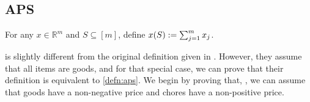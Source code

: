 \subsection{APS}
\label{sec:notions:aps}

For any $x \in \mathbb{R}^m$ and $S \subseteq [m]$, define $x(S) := \sum_{j=1}^m x_j$.


 is slightly different from the original definition given in \citet{babaioff2023fair}.
However, they assume that all items are goods, and for that special case,
we can prove that their definition is equivalent to \cref{defn:aps}.
We begin by proving that, \wLoG, we can assume that goods have a non-negative price
and chores have a non-positive price.

